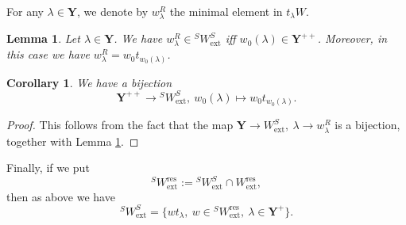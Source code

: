\documentclass[11pt]{amsart}
\theoremstyle{plain}
\newtheorem{lem}[thm]{Lemma}
\newtheorem{coro}[thm]{Corollary}
\theoremstyle{remark}
\numberwithin{equation}{section}
\begin{document}
 For any $\lambda\in \mathbf{Y}$, we denote by $w^R_\lambda$ the minimal element in $t_\lambda W$.
 \begin{lem}{{\cite[Lemma 2.5]{achar2021geometric}}}\label{lem maximal elmt}
     Let $\lambda\in\mathbf{Y}$. We have $w^R_\lambda\in{^SW_\mathrm{ext}^S}$ iff $w_0(\lambda)\in\mathbf{Y}^{++}$. Moreover, in this case we have $w^R_\lambda=w_0t_{w_0(\lambda)}$.
 \end{lem}
 \begin{coro}\label{coro domi}
     We have a bijection
     $$\mathbf{Y}^{++}\to  {^SW_\mathrm{ext}^S},~w_0(\lambda)\mapsto w_0t_{w_0(\lambda)}.$$
 \end{coro}
 \begin{proof}
     This follows from the fact that the map $\mathbf{Y}\to W_\mathrm{ext}^S,~\lambda\to w^R_\lambda$ is a bijection, together with Lemma \ref{lem maximal elmt}.
 \end{proof}
 Finally, if we put 
 $${^SW_\mathrm{ext}^\mathrm{res}}:={^SW_\mathrm{ext}^S}\cap W_\mathrm{ext}^\mathrm{res},$$
 then as above we have
 $$^SW^S_\mathrm{ext}=\{wt_\lambda,~w\in {^SW_\mathrm{ext}^\mathrm{res}},~\lambda\in\mathbf{Y}^+ \}. $$
	
\end{document}
